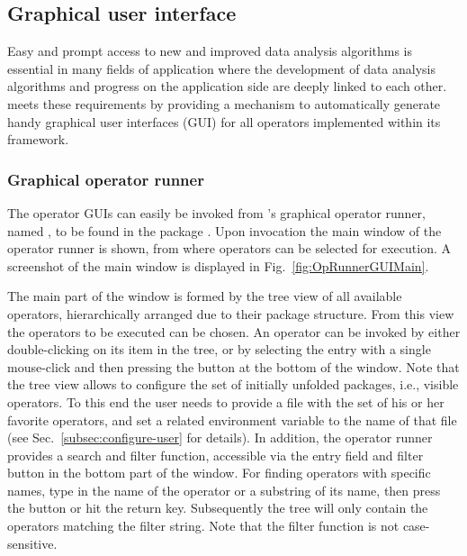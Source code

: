 \subsection{Graphical user interface}
\label{subsec:userGUI}
Easy and prompt access to new and improved data analysis algorithms is essential in many fields of application where the development 
of data analysis algorithms and progress on the application side are deeply linked to each other. \alida meets these requirements 
by providing a mechanism to automatically generate handy graphical user interfaces (GUI) for all operators implemented within its 
framework. 

\subsubsection{Graphical operator runner} 
The operator GUIs can easily be invoked from \alida's graphical operator runner,
named , to be found in the package
. Upon invocation the main window of
the operator runner is shown, from where operators can be selected for
execution. A screenshot of the main window is displayed in Fig.~\ref{fig:OpRunnerGUIMain}.

The main part of the window is formed by the tree view of all available
operators, hierarchically arranged due to their package structure. From this
view the operators to be executed can be chosen. An operator can be invoked by
either double-clicking on its item in the tree, or by selecting the entry with a
single mouse-click and then pressing the 
button at the bottom of the window. Note that the tree view allows to configure
the set of initially unfolded packages, i.e., visible operators.
To this end the user needs to provide a file with the set of his or her favorite
operators, and set a related environment variable to the name of that file (see
Sec.~\ref{subsec:configure-user} for details). In addition, the operator runner
provides a search and filter function, accessible via the entry field and
filter button in the bottom part of the window. For finding operators with
specific names, type in the name of the operator or a substring of its name,
then press the button or hit the return key. Subsequently the tree will only
contain the operators matching the filter string. Note that the filter function
is not case-sensitive.
  
